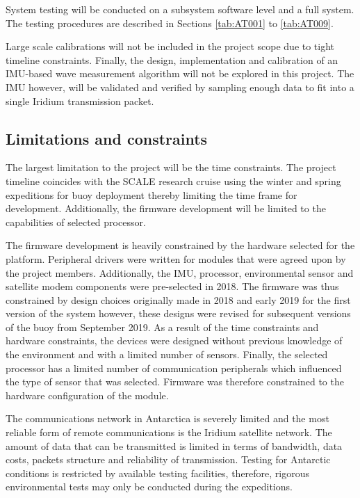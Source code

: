 System testing will be conducted on a subsystem software level and a full system. The testing procedures are described in Sections  \ref{tab:AT001} to \ref{tab:AT009}. 

Large scale calibrations will not be included in the project scope due to tight timeline constraints. Finally, the  design, implementation and calibration of an IMU-based wave measurement algorithm will not be explored in this project. The IMU however, will be validated and verified by sampling enough data to fit into a single Iridium transmission packet. 

\subsection{Limitations and constraints}

The largest limitation to the project will be the time constraints. The project timeline coincides with the SCALE research cruise using the winter and spring expeditions for buoy deployment thereby limiting the time frame for development. Additionally, the firmware development will be limited to the capabilities of selected processor. \par 

The firmware development is heavily constrained by the hardware selected for the platform. Peripheral drivers were written for modules that were agreed upon by the project members. Additionally, the IMU, processor, environmental sensor and satellite modem components were pre-selected in 2018. The firmware was thus constrained by design choices originally made in 2018 and early 2019 for the first version of the system however, these designs were revised for subsequent versions of the buoy from September 2019. As a result of the time constraints and hardware constraints, the devices were designed without previous knowledge of the environment and with a limited number of sensors.  Finally, the selected processor has a limited number of communication peripherals which influenced the type of sensor that was selected. Firmware was therefore constrained to the hardware configuration of the module.

The communications network in Antarctica is severely limited and the most reliable form of remote communications is the Iridium satellite network. The amount of data that can be transmitted is limited in terms of bandwidth, data costs, packets structure and reliability of transmission. Testing for Antarctic conditions is restricted by available testing facilities, therefore, rigorous environmental tests may only be conducted during the expeditions.\par 

